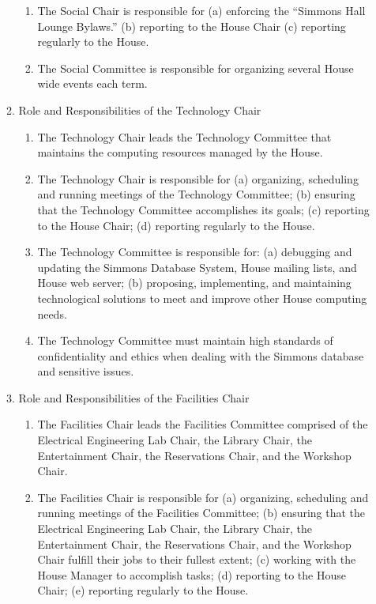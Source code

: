 \documentclass[letterpaper]{article}
\begin{document}
\begin{enumerate}
\begin{enumerate}
\begin{enumerate}
\item The Social Chair is responsible for (a) enforcing the ``Simmons Hall Lounge Bylaws.'' (b) reporting to the House Chair (c) reporting regularly to the House.

\item The Social Committee is responsible for organizing several House wide events each term.

\end{enumerate}

\item Role and Responsibilities of the Technology Chair 

\begin{enumerate}

\item The Technology Chair leads the Technology Committee that maintains the computing resources managed by the House. 

\item The Technology Chair is responsible for (a) organizing, scheduling and running meetings of the Technology Committee; (b) ensuring that the Technology Committee accomplishes its goals; (c) reporting to the House Chair; (d) reporting regularly to the House.

\item The Technology Committee is responsible for: (a) debugging and updating the Simmons Database System, House mailing lists, and House web server; (b) proposing, implementing, and maintaining technological solutions to meet and improve other House computing needs.

\item The Technology Committee must maintain high standards of confidentiality and ethics when dealing with the Simmons database and sensitive issues.

\end{enumerate}

\item Role and Responsibilities of the Facilities Chair 

\begin{enumerate}

\item The Facilities Chair leads the Facilities Committee comprised of the Electrical Engineering Lab Chair, the Library Chair, the Entertainment Chair, the Reservations Chair, and the Workshop Chair. 

\item The Facilities Chair is responsible for (a) organizing, scheduling and running meetings of the Facilities Committee; (b) ensuring that the Electrical Engineering Lab Chair, the Library Chair, the Entertainment Chair, the Reservations Chair, and the Workshop Chair fulfill their jobs to their fullest extent; (c) working with the House Manager to accomplish tasks; (d) reporting to the House Chair; (e) reporting regularly to the House. 


\end{enumerate}
\end{enumerate}
\end{enumerate}
\end{document}
